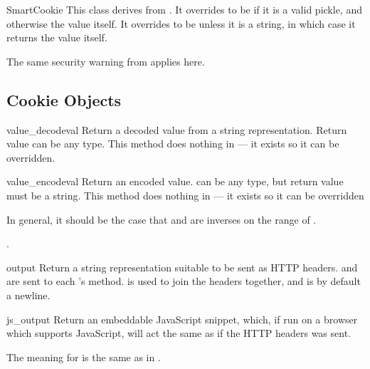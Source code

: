 \begin{classdesc}{SmartCookie}{}
This class derives from . It overrides 
to be  if it is a valid pickle, and otherwise
the value itself. It overrides  to be 
 unless it is a string, in which case it returns
the value itself.

The same security warning from  applies here.
\end{classdesc}


\begin{seealso}
\end{seealso}


\subsection{Cookie Objects \label{cookie-objects}}

\begin{methoddesc}[BaseCookie]{value_decode}{val}
Return a decoded value from a string representation. Return value can
be any type. This method does nothing in  --- it exists
so it can be overridden.
\end{methoddesc}

\begin{methoddesc}[BaseCookie]{value_encode}{val}
Return an encoded value.  can be any type, but return value
must be a string. This method does nothing in  --- it exists
so it can be overridden

In general, it should be the case that  and 
 are inverses on the range of .
\end{methoddesc}.

\begin{methoddesc}[BaseCookie]{output}{}
Return a string representation suitable to be sent as HTTP headers.
 and  are sent to each 's 
method.  is used to join the headers together, and is by default
a newline.
\end{methoddesc}

\begin{methoddesc}[BaseCookie]{js_output}{}
Return an embeddable JavaScript snippet, which, if run on a browser which
supports JavaScript, will act the same as if the HTTP headers was sent.

The meaning for  is the same as in .
\end{methoddesc}


